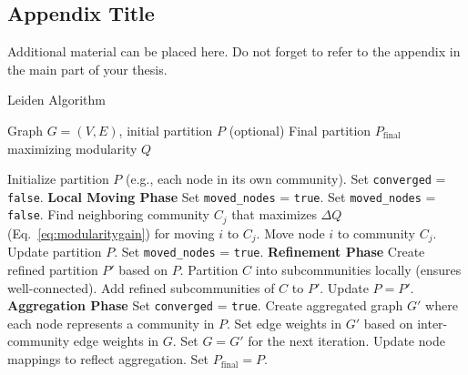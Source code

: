 \begin{appendix}
\chapter{Appendix Title}
\label{appendix:appendix}

Additional material can be placed here. Do not forget to refer to the appendix in the main part of your thesis.

\begin{algorithm}[H]
\caption{Leiden Algorithm}
\label{alg:leiden_appendix}
\begin{algorithmic}[1]
\Require Graph $G = (V, E)$, initial partition $P$ (optional)
\Ensure Final partition $P_{\text{final}}$ maximizing modularity $Q$

\State Initialize partition $P$ (e.g., each node in its own community).
\State Set \texttt{converged} = \texttt{false}.
    \State \textbf{Local Moving Phase}
    \State Set \texttt{moved\_nodes} = \texttt{true}.
        \State Set \texttt{moved\_nodes} = \texttt{false}.
            \State Find neighboring community $C_j$ that maximizes $\Delta Q$ (Eq.~\eqref{eq:modularitygain}) for moving $i$ to $C_j$.
                \State Move node $i$ to community $C_j$.
                \State Update partition $P$.
                \State Set \texttt{moved\_nodes} = \texttt{true}.
            \EndIf
        \EndFor
    \EndWhile
    \State \textbf{Refinement Phase}
    \State Create refined partition $P'$ based on $P$.
        \State Partition $C$ into subcommunities locally (ensures well-connected).
        \State Add refined subcommunities of $C$ to $P'$.
    \EndFor
    \State Update $P = P'$.
    \State \textbf{Aggregation Phase}
        \State Set \texttt{converged} = \texttt{true}.
    \Else
        \State Create aggregated graph $G'$ where each node represents a community in $P$.
        \State Set edge weights in $G'$ based on inter-community edge weights in $G$.
        \State Set $G = G'$ for the next iteration.
        \State Update node mappings to reflect aggregation.
    \EndIf
\EndWhile
\State Set $P_{\text{final}} = P$.
\end{algorithmic}
\end{algorithm}

\end{appendix}

